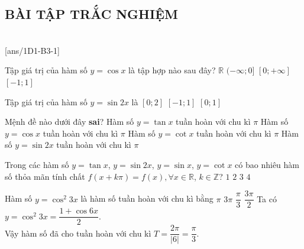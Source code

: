 \subsection{BÀI TẬP TRẮC NGHIỆM}
\setcounter{ex}{0}
 \\
\setcounter{ex}{0}
[ans/1D1-B3-1]
\begin{ex}%
	Tập giá trị của hàm số $y= \cos x$ là tập hợp nào sau đây?
	\choice
	{$\mathbb{R}$}
	{$(-\infty; 0]$}
	{$[0; +\infty]$}
	{\True $ [-1; 1]$}
\end{ex}

\begin{ex}%
	Tập giá trị của hàm số $y=\sin 2x$ là
	\choice{$[-2;2]$}
	{$[0;2]$}
	{\True $[-1;1]$}
	{$[0;1]$}
\end{ex}

\begin{ex}%
	Mệnh đề nào dưới đây \textbf{sai}?
	\choice
	{Hàm số $y=\tan x$ tuần hoàn với chu kì $\pi$}
	{\True Hàm số $y=\cos x$ tuần hoàn với chu kì $\pi$}
	{Hàm số $y=\cot x$ tuần hoàn với chu kì $\pi$}
	{Hàm số $y=\sin2x$ tuần hoàn với chu kì $\pi$}
\end{ex}

\begin{ex}%
	Trong các hàm số $y=\tan x$, $y=\sin 2x$, $y=\sin x$, $y=\cot x$ có bao nhiêu hàm số thỏa mãn tính chất $f(x+k\pi)=f(x), \forall x\in \mathbb{R}$, $k\in\mathbb{Z}$?
	\choice
	{\True $1$}
	{$2$}
	{$3$}
	{$4$}
\end{ex}

\begin{ex}%
	Hàm số $y=\cos^2 3x$ là hàm số tuần hoàn với chu kì bằng
	\choice
	{$\pi$}
	{$3\pi$}
	{\True $\dfrac{\pi}{3}$}
	{$\dfrac{3\pi}{2}$}
	\loigiai
	{
	Ta có $y=\cos^2 3x=\dfrac{1+\cos 6x}{2}$.\\
		Vậy hàm số đã cho tuần hoàn với chu kì $T=\dfrac{2\pi}{\left|6\right|}=\dfrac{\pi}{3}$.
	}
\end{ex}

